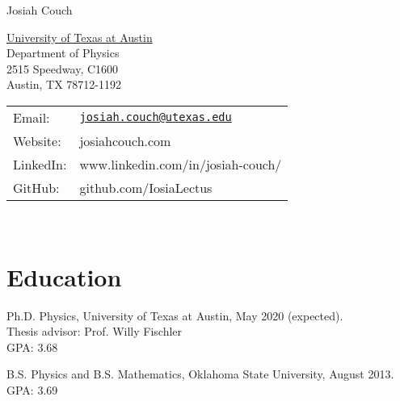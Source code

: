 \documentclass[letterpaper]{article}
\def\name{Josiah Couch}
\renewenvironment{itemize}{
  \begin{list}{}{
    \setlength{\leftmargin}{1.5em}
  }
}{
  \end{list}
}
\begin{document}
{\huge \name}


\vspace{0.25in}

\begin{minipage}{0.45\linewidth}
  \href{}{University of Texas at Austin} \\
  Department of Physics \\
  2515 Speedway, C1600 \\
  Austin, TX 78712-1192
\end{minipage}
\begin{minipage}{0.45\linewidth}
  \begin{tabular}{ll}
    Email: & \href{mailto:josiah.couch@utexas.edu}{\tt josiah.couch@utexas.edu} \\
    Website: & josiahcouch.com \\
    LinkedIn: & www.linkedin.com/in/josiah-couch/ \\
    GitHub: & github.com/IosiaLectus
  \end{tabular}
\end{minipage}
\

\section*{Education}

\begin{itemize}

\item Ph.D. Physics, University of Texas at Austin, \hfill  May 2020 (expected).\\
  Thesis advisor: Prof. Willy Fischler\\
  GPA: 3.68
  
  
  \item B.S. Physics and B.S. Mathematics, Oklahoma State University, \hfill August 2013.\\
  GPA: 3.69

\end{itemize}
\end{document}
